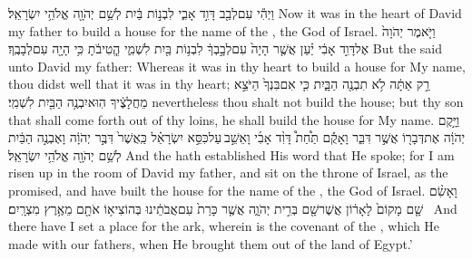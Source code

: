 {וַיְהִ֕י עִם\maqqaf לְבַ֖ב דָּוִ֣ד אָבִ֑י לִבְנ֣וֹת בַּ֔יִת לְשֵׁ֥ם יְהֹוָ֖ה אֱלֹהֵ֥י יִשְׂרָאֵֽל׃}
{Now it was in the heart of David my father to build a house for the name of the \lord, the God of Israel.}
{וַיֹּ֤אמֶר יְהֹוָה֙ אֶל\maqqaf דָּוִ֣ד אָבִ֔י יַ֗עַן אֲשֶׁ֤ר הָיָה֙ עִם\maqqaf לְבָ֣בְךָ֔ לִבְנ֥וֹת בַּ֖יִת לִשְׁמִ֑י הֱֽטִיבֹ֔תָ כִּ֥י הָיָ֖ה עִם\maqqaf לְבָבֶֽךָ׃}
{But the \lord\space said unto David my father: Whereas it was in thy heart to build a house for My name, thou didst well that it was in thy heart;}
{רַ֣ק אַתָּ֔ה לֹ֥א תִבְנֶ֖ה הַבָּ֑יִת כִּ֤י אִם\maqqaf בִּנְךָ֙ הַיֹּצֵ֣א מֵחֲלָצֶ֔יךָ הֽוּא\maqqaf יִבְנֶ֥ה הַבַּ֖יִת לִשְׁמִֽי׃}
{nevertheless thou shalt not build the house; but thy son that shall come forth out of thy loins, he shall build the house for My name.}
{וַיָּ֣קֶם יְהֹוָ֔ה אֶת\maqqaf דְּבָר֖וֹ אֲשֶׁ֣ר דִּבֵּ֑ר וָאָקֻ֡ם תַּ֩חַת֩ דָּוִ֨ד אָבִ֜י וָאֵשֵׁ֣ב \legarmeh  עַל\maqqaf כִּסֵּ֣א יִשְׂרָאֵ֗ל כַּֽאֲשֶׁר֙ דִּבֶּ֣ר יְהֹוָ֔ה וָאֶבְנֶ֣ה הַבַּ֔יִת לְשֵׁ֥ם יְהֹוָ֖ה אֱלֹהֵ֥י יִשְׂרָאֵֽל׃}
{And the \lord\space hath established His word that He spoke; for I am risen up in the room of David my father, and sit on the throne of Israel, as the \lord\space promised, and have built the house for the name of the \lord, the God of Israel.}
{וָאָשִׂ֨ם שָׁ֤ם מָקוֹם֙ לָאָר֔וֹן אֲשֶׁר\maqqaf שָׁ֖ם בְּרִ֣ית יְהֹוָ֑ה אֲשֶׁ֤ר כָּרַת֙ עִם\maqqaf אֲבֹתֵ֔ינוּ בְּהוֹצִיא֥וֹ אֹתָ֖ם מֵאֶ֥רֶץ מִצְרָֽיִם׃ \setuma }
{And there have I set a place for the ark, wherein is the covenant of the \lord, which He made with our fathers, when He brought them out of the land of Egypt.’}
\newperek
